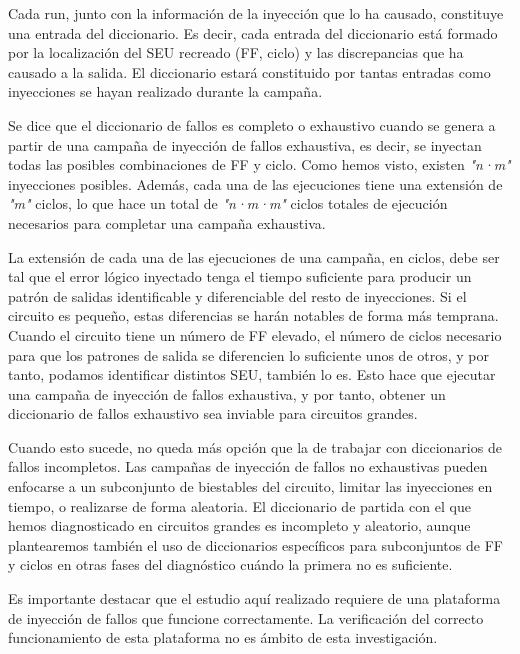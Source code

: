 Cada run, junto con la información de la inyección que lo ha causado, constituye
una entrada del diccionario. Es decir, cada entrada del diccionario está formado
por la localización del \gls{SEU} recreado (\gls{FF}, ciclo) y las discrepancias 
que ha causado a la salida. El diccionario estará constituido por tantas entradas 
como inyecciones se hayan realizado durante la campaña.

Se dice que el diccionario de fallos es completo o exhaustivo cuando se genera a
partir de una campaña de inyección de fallos exhaustiva, es decir, se inyectan
todas las posibles combinaciones de \gls{FF} y ciclo. 
Como hemos visto, existen \textit{"n·m"} inyecciones posibles. Además, cada una de 
las ejecuciones tiene una extensión de \textit{"m"} ciclos, lo que hace un total 
de  \textit{"n·m·m"} ciclos totales de ejecución necesarios para completar una
campaña exhaustiva.

La extensión de cada una de las ejecuciones de una campaña, en ciclos, debe ser
tal que el error lógico inyectado tenga el tiempo suficiente para producir un 
patrón de salidas identificable y diferenciable del resto de inyecciones. Si el
circuito es pequeño, estas diferencias se harán notables de forma más temprana.
Cuando el circuito tiene un número de \gls{FF} elevado, el número de ciclos
necesario para que los patrones de salida se diferencien lo suficiente unos de 
otros, y por tanto, podamos identificar distintos \gls{SEU}, también lo es. Esto
hace que ejecutar una campaña de inyección de fallos exhaustiva, y por tanto, 
obtener un diccionario de fallos exhaustivo sea inviable para circuitos grandes.

Cuando esto sucede, no queda más opción que la de trabajar con diccionarios de
fallos incompletos. Las campañas de inyección de fallos no exhaustivas pueden
enfocarse a un subconjunto de biestables del circuito, limitar las inyecciones en 
tiempo, o realizarse de forma aleatoria. El diccionario de partida con el que
hemos diagnosticado en circuitos grandes es incompleto y aleatorio, aunque
plantearemos también el uso de diccionarios específicos para subconjuntos de
\gls{FF} y ciclos en otras fases del diagnóstico cuándo la primera no es
suficiente.

Es importante destacar que el estudio aquí realizado requiere de una plataforma 
de inyección de fallos que funcione correctamente. La verificación del correcto 
funcionamiento de esta plataforma no es ámbito de esta investigación.

